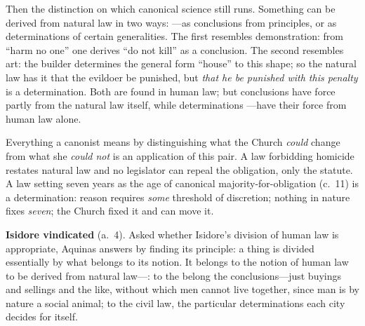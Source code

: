 Then the distinction on which canonical science still runs. Something can be derived from natural law in two ways: ---as conclusions from principles, or as determinations of certain generalities. The first resembles demonstration: from ``harm no one'' one derives ``do not kill'' as a conclusion. The second resembles art: the builder determines the general form ``house'' to this shape; so the natural law has it that the evildoer be punished, but \emph{that he be punished with this penalty} is a determination. Both are found in human law; but conclusions have force partly from the natural law itself, while determinations ---have their force from human law alone.

Everything a canonist means by distinguishing what the Church \emph{could} change from what she \emph{could not} is an application of this pair. A law forbidding homicide restates natural law and no legislator can repeal the obligation, only the statute. A law setting seven years as the age of canonical majority-for-obligation (c.~11) is a determination: reason requires \emph{some} threshold of discretion; nothing in nature fixes \emph{seven}; the Church fixed it and can move it.

\textbf{Isidore vindicated} (a.~4). Asked whether Isidore's division of human law is appropriate, Aquinas answers by finding its principle: a thing is divided essentially by what belongs to its notion. It belongs to the notion of human law to be derived from natural law---: to the  belong the conclusions---just buyings and sellings and the like, without which men cannot live together, since man is by nature a social animal; to the civil law, the particular determinations each city decides for itself.

